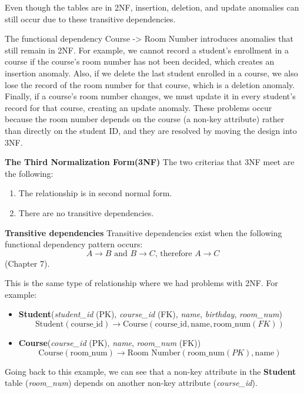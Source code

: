 Even though the tables are in 2NF, insertion, deletion, and update anomalies can still occur due to these transitive dependencies.

The functional dependency Course -> Room Number introduces anomalies that still remain in 2NF. 
For example, we cannot record a student’s enrollment in a course if the course’s room number has not been decided, which creates an insertion anomaly. 
Also, if we delete the last student enrolled in a course, we also lose the record of the room number for that course, which is a deletion anomaly. 
Finally, if a course’s room number changes, we must update it in every student’s record for that course, creating an update anomaly. 
These problems occur because the room number depends on the course (a non-key attribute) rather than directly on the student ID, 
and they are resolved by moving the design into 3NF.

\textbf{The Third Normalization Form(3NF)}
The two criterias that 3NF meet are the following:

\begin{enumerate}
    \item The relationship is in second normal form.
    \item There are no transitive dependencies.
\end{enumerate}

\textbf{Transitive dependencies}
Transitive dependencies exist when the following functional dependency pattern occurs:  
\[
A \rightarrow B \text{ and } B \rightarrow C \text{, therefore } A \rightarrow C
\] 
(Chapter 7).  

This is the same type of relationship where we had problems with 2NF. For example:

\begin{itemize}
    \item \textbf{Student}(\textit{student\_id} (PK), \textit{course\_id} (FK), \textit{name}, \textit{birthday}, \textit{room\_num}) 
    \[
    \text{Student}(\text{course\_id}) \rightarrow \text{Course}(\text{course\_id}, \text{name}, \text{room\_num} (FK))
    \]
    
    \item \textbf{Course}(\textit{course\_id} (PK), \textit{name}, \textit{room\_num} (FK)) 
    \[
    \text{Course}(\text{room\_num}) \rightarrow \text{Room Number}(\text{room\_num} (PK), \text{name})
    \]
\end{itemize}

Going back to this example, we can see that a non-key attribute in the \textbf{Student} table (\textit{room\_num}) depends on another non-key attribute (\textit{course\_id}).  

